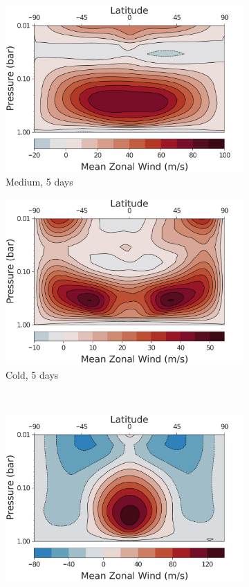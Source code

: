 \begin{figure}
\begin{subfigure}[b]{0.32\textwidth}
      \includegraphics[width=\textwidth]{figures/eqm-zonal-flow/wind-med-5.pdf}
      \caption{Medium, 5 days}
    \end{subfigure}
    \begin{subfigure}[b]{0.32\textwidth}
      \includegraphics[width=\textwidth]{figures/eqm-zonal-flow/wind-cold-5.pdf}
      \caption{Cold, 5 days}
    \end{subfigure}
     \\
     \begin{subfigure}[b]{0.32\textwidth}
       \includegraphics[width=\textwidth]{figures/eqm-zonal-flow/wind-hot-2.pdf}

\end{subfigure}
\end{figure}
